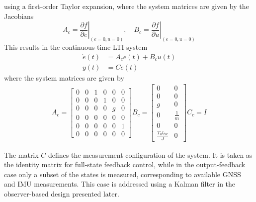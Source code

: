 \documentclass[10pt,twocolumn,twoside]{IEEEtran}
\begin{document}
using a first-order Taylor expansion, where the system matrices are given by the Jacobians
\begin{equation}
    A_c = \left.\frac{\partial f}{\partial e}\right|_{(e=0,u=0)}, \quad
    B_c = \left.\frac{\partial f}{\partial u}\right|_{(e=0,u=0)}
    \label{eq:1.11}
\end{equation}
This results in the continuous-time LTI system
\begin{equation}
    \begin{aligned}
        \dot{e}(t) &= A_c e(t) + B_c u(t) \\
        y(t) &= C e(t)
    \end{aligned}
    \label{eq:1.12}
\end{equation}
where the system matrices are given by
\begin{equation}
    \begin{gathered}
        A_c =
    \begin{bmatrix}
        0 & 0 & 1 & 0 & 0 & 0 \\
        0 & 0 & 0 & 1 & 0 & 0 \\
        0 & 0 & 0 & 0 & g & 0 \\
        0 & 0 & 0 & 0 & 0 & 0 \\
        0 & 0 & 0 & 0 & 0 & 1 \\
        0 & 0 & 0 & 0 & 0 & 0
    \end{bmatrix}
        B_c =
    \begin{bmatrix}
        0 & 0 \\
        0 & 0 \\
        g & 0 \\
        0 & \frac{1}{m} \\
        0 & 0 \\
        \frac{T_0 l_{tvc}}{J} & 0
    \end{bmatrix}
        C_c = I
    \end{gathered}
    \label{eq:1.13}
\end{equation}

The matrix $C$ defines the measurement configuration of the system. It is taken as the identity matrix for full-state feedback control, while in the output-feedback case only a subset of the states is measured, corresponding to available GNSS and IMU measurements. This case is addressed using a Kalman filter in the observer-based design presented later. 
\end{document}
